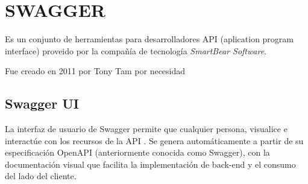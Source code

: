 \chapter{SWAGGER}
Es un conjunto de herramientas para desarrolladores API (aplication program interface) proveido por la compañía de tecnología \textit{SmartBear Software}. 

Fue creado en 2011 por Tony Tam por necesidad
\section{Swagger UI}
La interfaz de usuario de Swagger permite que cualquier persona, visualice e interactúe con los recursos de la API . Se genera automáticamente a partir de su especificación OpenAPI (anteriormente conocida como Swagger), con la documentación visual que facilita la implementación de back-end y el consumo del lado del cliente.


    
